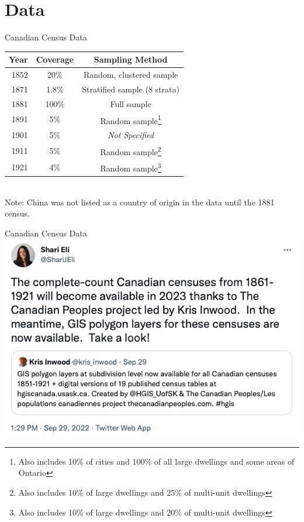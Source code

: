 \documentclass[pdf]{beamer}
\begin{document}
\section{Data}
\begin{frame}{Canadian Census Data}
    \centering
    \begin{tabular}{|r||c|c|}
        \hline 
        Year & Coverage & Sampling Method \\
        \hline 
        1852 & 20\% & Random, clustered sample \\
        1871 & 1.8\% & Stratified sample (8 strata)\\
        1881 & 100\% & Full sample \\
        1891 & 5\% & Random sample\footnote{Also includes 10\% of cities and 100\% of all large dwellings and some areas of Ontario} \\
        1901 & 5\% & \textit{Not Specified} \\
        1911 & 5\% & Random sample\footnote{Also includes 10\% of large dwellings and 25\% of multi-unit dwellings} \\
        1921 & 4\% & Random sample\footnote{Also includes 10\% of large dwellings and 20\% of multi-unit dwellings} \\
        \hline
    \end{tabular} \\
    Note: China was not listed as a country of origin in the data until the 1881 census.
\end{frame}

\begin{frame}{Canadian Census Data}
    \includegraphics[width = \textwidth]{../../figs/census_tweet.png}
\end{frame}
\end{document}
